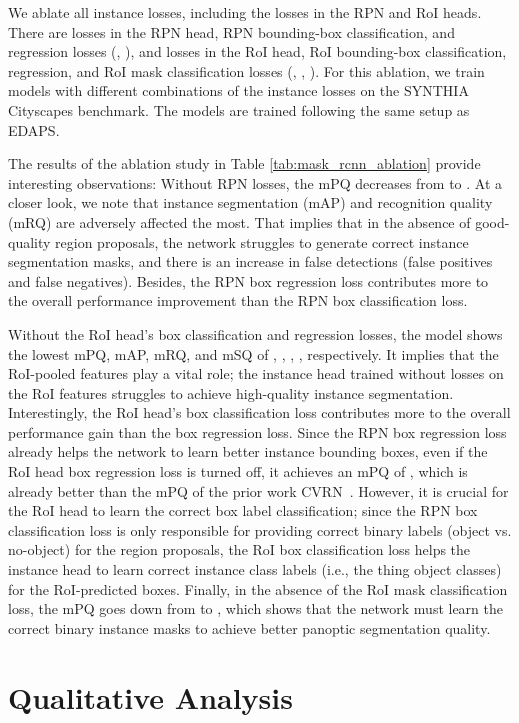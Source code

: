 \documentclass[10pt,twocolumn,letterpaper]{article}
\begin{document}
We ablate all  instance losses, including the losses in the RPN and RoI heads.
There are  losses in the RPN head, RPN bounding-box classification, and regression losses (, ),
and  losses in the RoI head, RoI bounding-box classification, regression, and RoI mask classification losses (, 
, ).
For this ablation, we train  models with different combinations of the instance losses on the SYNTHIA  Cityscapes benchmark.
The models are trained following the same setup as EDAPS.

The results of the ablation study in Table \ref{tab:mask_rcnn_ablation} provide interesting observations:
Without RPN losses, the mPQ decreases from  to .
At a closer look, we note that instance segmentation (mAP) and recognition quality (mRQ) are adversely affected the most.
That implies that in the absence of good-quality region proposals, the network struggles to generate correct instance segmentation masks, and there is an increase in false detections (false positives and false negatives).
Besides, the RPN box regression loss contributes more to the overall performance improvement than the RPN box classification loss. 

Without the RoI head's box classification and regression losses,
the model shows the lowest mPQ, mAP, mRQ, and mSQ of , , , , respectively.
It implies that the RoI-pooled features play a vital role; the instance head trained without losses on the RoI features struggles to achieve high-quality instance segmentation.
Interestingly, the RoI head's box classification loss contributes more to the overall performance gain than the box regression loss.
Since the RPN box regression loss already helps the network to learn better instance bounding boxes, even if the RoI head box regression loss is turned off, it achieves an mPQ of , which is already better than the  mPQ of the prior work CVRN~\cite{huang2021cross}.
However, it is crucial for the RoI head to learn the correct box label classification; since the RPN box classification loss is only responsible for providing correct binary labels (object vs. no-object) for the region proposals, the RoI box classification loss helps the instance head to learn correct instance class labels (i.e., the  thing object classes) for the RoI-predicted boxes.
Finally, in the absence of the RoI mask classification loss, the mPQ goes down from  to  , which shows that the network must learn the correct binary instance masks to achieve better panoptic segmentation quality.

\section{Qualitative Analysis}
\label{sec:qualitative_analysis}
\end{document}
